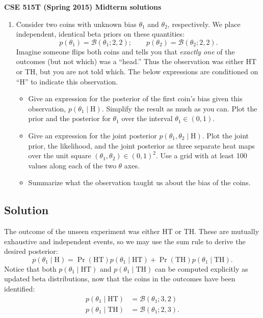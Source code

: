 \documentclass{article}
\newcommand{\given}{\mid}
\newcommand{\mc}[1]{\mathcal{#1}}
\begin{document}
{\large \textbf{CSE 515T (Spring 2015) Midterm solutions}}
\begin{enumerate}
\item
  Consider two coins with unknown bias $\theta_1$ and $\theta_2$,
  respectively.  We place independent, identical beta priors on these
  quantities:
  \begin{equation*}
    p(\theta_1) = \mc{B}(\theta_1; 2, 2);
    \qquad
    p(\theta_2) = \mc{B}(\theta_2; 2, 2).
  \end{equation*}
  Imagine someone flips both coins and tells you that \emph{exactly
    one} of the outcomes (but not which) was a ``head.''  Thus the
  observation was either HT or TH, but you are not told which.  The
  below expressions are conditioned on ``H'' to indicate this
  observation.
  \begin{itemize}
  \item
    Give an expression for the posterior of the first coin's bias
    given this observation, $p(\theta_1 \given \text{H})$.  Simplify
    the result as much as you can.  Plot the prior and the posterior
    for $\theta_1$ over the interval $\theta_1 \in (0, 1)$.
  \item
    Give an expression for the joint posterior $p(\theta_1, \theta_2
    \given \text{H})$. Plot the joint prior, the likelihood, and the
    joint posterior as three separate heat maps over the unit square
    $(\theta_1, \theta_2) \in (0, 1)^2$.  Use a grid with at least 100
    values along each of the two $\theta$ axes.
  \item
    Summarize what the observation taught us about the bias of the
    coins.
  \end{itemize}
\end{enumerate}

\subsection*{Solution}

The outcome of the unseen experiment was either HT or TH.  These are
mutually exhaustive and independent events, so we may use the sum
rule to derive the desired posterior:
\begin{equation*}
  p(\theta_1 \given \text{H})
  =
  \Pr(\text{HT})p(\theta_1 \given \text{HT})
  +
  \Pr(\text{TH})p(\theta_1 \given \text{TH})
  .
\end{equation*}
Notice that both $p(\theta_1 \given \text{HT})$ and $p(\theta_1 \given
\text{TH})$ can be computed explicitly as updated beta distributions,
now that the coins in the outcomes have been identified:
\begin{align*}
  p(\theta_1 \given \text{HT})
  &=
  \mc{B}(\theta_1; 3, 2)
  \\
  p(\theta_1 \given \text{TH})
  &=
  \mc{B}(\theta_1; 2, 3).
\end{align*}
\end{document}
